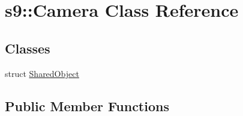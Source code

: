\hypertarget{classs9_1_1Camera}{\section{s9\-:\-:Camera Class Reference}
\label{classs9_1_1Camera}
}
\subsection*{Classes}
\begin{DoxyCompactItemize}
\item 
struct \hyperlink{structs9_1_1Camera_1_1SharedObject}{Shared\-Object}
\end{DoxyCompactItemize}
\subsection*{Public Member Functions}
